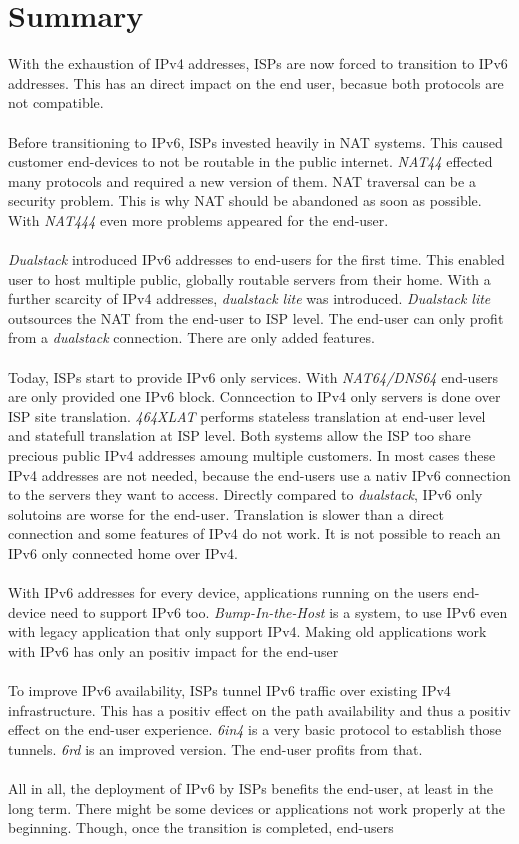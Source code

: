 \documentclass[format=sigconf, natbib=true, nonacm=true]{acmart}
\begin{document}
    \section{Summary}
    With the exhaustion of IPv4 addresses, ISPs are now forced to transition to IPv6 addresses. This has an direct impact on the end user, becasue both protocols are not compatible.\\\\Before transitioning to IPv6, ISPs invested heavily in NAT systems. This caused customer end-devices to not be routable in the public internet. \textit{NAT44} effected many protocols and required a new version of them. NAT traversal can be a security problem. This is why NAT should be abandoned as soon as possible. With \textit{NAT444} even more problems appeared for the end-user.\\\\\textit{Dualstack} introduced IPv6 addresses to end-users for the first time. This enabled user to host multiple public, globally routable servers from their home. With a further scarcity of IPv4 addresses, \textit{dualstack lite} was introduced. \textit{Dualstack lite} outsources the NAT from the end-user to ISP level. The end-user can only profit from a \textit{dualstack} connection. There are only added features.\\\\Today, ISPs start to provide IPv6 only services. With \textit{NAT64/DNS64} end-users are only provided one IPv6 block. Conncection to IPv4 only servers is done over ISP site translation. \textit{464XLAT} performs stateless translation at end-user level and statefull translation at ISP level. Both systems allow the ISP too share precious public IPv4 addresses amoung multiple customers. In most cases these IPv4 addresses are not needed, because the end-users use a nativ IPv6 connection to the servers they want to access. Directly compared to \textit{dualstack}, IPv6 only solutoins are worse for the end-user. Translation is slower than a direct connection and some features of IPv4 do not work. It is not possible to reach an IPv6 only connected home over IPv4.\\\\With IPv6 addresses for every device, applications running on the users end-device need to support IPv6 too. \textit{Bump-In-the-Host} is a system, to use IPv6 even with legacy application that only support IPv4. Making old applications work with IPv6 has only an positiv impact for the end-user\\\\To improve IPv6 availability, ISPs tunnel IPv6 traffic over existing IPv4 infrastructure. This has a positiv effect on the path availability and thus a positiv effect on the end-user experience. \textit{6in4} is a very basic protocol to establish those tunnels. \textit{6rd} is an improved version. The end-user profits from that.\\\\All in all, the deployment of IPv6 by ISPs benefits the end-user, at least in the long term. There might be some devices or applications not work properly at the beginning. Though, once the transition is completed, end-users 
\end{document}
